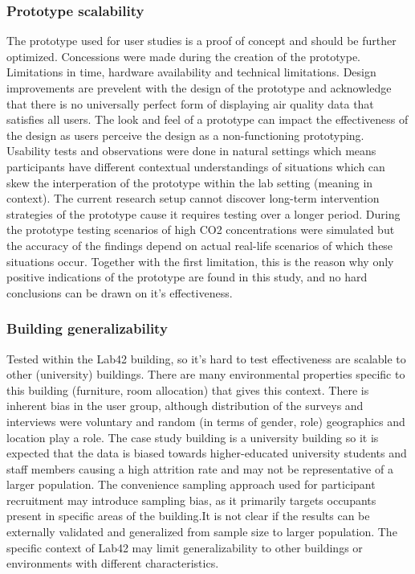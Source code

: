 \subsubsection{Prototype scalability}
The prototype used for user studies is a proof of concept and should be further optimized. Concessions were made during the creation of the prototype. Limitations in time, hardware availability and technical limitations. Design improvements are prevelent with the design of the prototype and acknowledge that there is no universally perfect form of displaying air quality data that satisfies all users. The look and feel of a prototype can impact the effectiveness of the design as users perceive the design as a non-functioning prototyping. Usability tests and observations were done in natural settings which means participants have different contextual understandings of situations which can skew the interperation of the prototype within the lab setting (meaning in context). The current research setup cannot discover long-term intervention strategies of the prototype cause it requires testing over a longer period. During the prototype testing scenarios of high CO2 concentrations were simulated but the accuracy of the findings depend on actual real-life scenarios of which these situations occur. Together with the first limitation, this is the reason why only positive indications of the prototype are found in this study, and no hard conclusions can be drawn on it's effectiveness. 

\subsubsection{Building generalizability}
Tested within the Lab42 building, so it's hard to test effectiveness are scalable to other (university) buildings. There are many environmental properties specific to this building (furniture, room allocation) that gives this context. There is inherent bias in the user group, although distribution of the surveys and interviews were voluntary and random (in terms of gender, role) geographics and location play a role. The case study building is a university building so it is expected that the data is biased towards higher-educated university students and staff members causing a high attrition rate and may not be representative of a larger population. The convenience sampling approach used for participant recruitment may introduce sampling bias, as it primarily targets occupants present in specific areas of the building.It is not clear if the results can be externally validated and generalized from sample size to larger population. The specific context of Lab42 may limit generalizability to other buildings or environments with different characteristics. 

